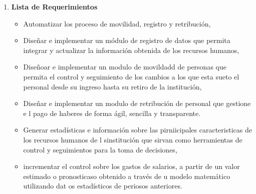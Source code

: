 \begin{enumerate}[a]
\item \textbf{Lista de Requerimientos} \begin{itemize}
  \item Automatizar los proceso de movilidad, registro y retribución,
  \item Diseñar e implementar un módulo de registro de datos que permita integrar y actualizar la información obtenida de los recursos humanos,
  \item Diseñoar e implementar un modulo de movildadd de personas que permita el control y seguimiento de los cambios a los que esta sueto el personal desde su ingreso hasta su retiro de la institución,
  \item Diseñar e implementar un modulo de retribución de personal que gestione e l pago de haberes de forma ágil, sencilla y transparente.
  \item Generar estadísticas e información sobre las pirniicipales caracteristicas de los recursos humanos de l sinstitución que sirvan como herramientas de control y seguimientos para la toma de decisiones,
  \item incrementar el control sobre los gastos de salarios, a partir de un valor estimado o pronosticaso obtenido a través de u modelo matemático utilizando dat os estadísticos de periosos anteriores.
\end{itemize}


\end{enumerate}
